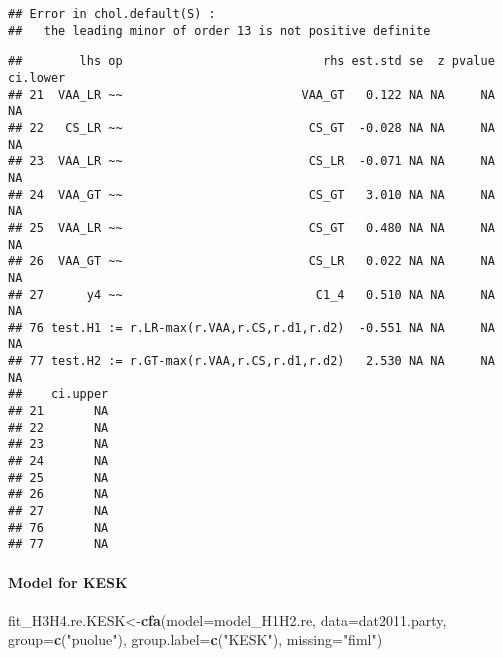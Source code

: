 \documentclass[
]{article}
\newenvironment{Shaded}{\begin{snugshade}}{\end{snugshade}}
\newcommand{\DataTypeTok}[1]{\textcolor[rgb]{0.13,0.29,0.53}{#1}}
\newcommand{\KeywordTok}[1]{\textcolor[rgb]{0.13,0.29,0.53}{\textbf{#1}}}
\newcommand{\NormalTok}[1]{#1}
\newcommand{\OperatorTok}[1]{\textcolor[rgb]{0.81,0.36,0.00}{\textbf{#1}}}
\newcommand{\StringTok}[1]{\textcolor[rgb]{0.31,0.60,0.02}{#1}}
\begin{document}
\begin{verbatim}
## Error in chol.default(S) : 
##   the leading minor of order 13 is not positive definite
\end{verbatim}

\begin{Shaded}
\end{Shaded}

\begin{verbatim}
##        lhs op                            rhs est.std se  z pvalue ci.lower
## 21  VAA_LR ~~                         VAA_GT   0.122 NA NA     NA       NA
## 22   CS_LR ~~                          CS_GT  -0.028 NA NA     NA       NA
## 23  VAA_LR ~~                          CS_LR  -0.071 NA NA     NA       NA
## 24  VAA_GT ~~                          CS_GT   3.010 NA NA     NA       NA
## 25  VAA_LR ~~                          CS_GT   0.480 NA NA     NA       NA
## 26  VAA_GT ~~                          CS_LR   0.022 NA NA     NA       NA
## 27      y4 ~~                           C1_4   0.510 NA NA     NA       NA
## 76 test.H1 := r.LR-max(r.VAA,r.CS,r.d1,r.d2)  -0.551 NA NA     NA       NA
## 77 test.H2 := r.GT-max(r.VAA,r.CS,r.d1,r.d2)   2.530 NA NA     NA       NA
##    ci.upper
## 21       NA
## 22       NA
## 23       NA
## 24       NA
## 25       NA
## 26       NA
## 27       NA
## 76       NA
## 77       NA
\end{verbatim}

\newpage

\hypertarget{model-for-kesk}{%
\paragraph{Model for KESK}\label{model-for-kesk}}

\begin{Shaded}
\begin{Highlighting}[]
\NormalTok{fit_H3H4.re.KESK<-}\KeywordTok{cfa}\NormalTok{(}\DataTypeTok{model=}\NormalTok{model_H1H2.re,}
                    \DataTypeTok{data=}\NormalTok{dat2011.party,}
                    \DataTypeTok{group=}\KeywordTok{c}\NormalTok{(}\StringTok{"puolue"}\NormalTok{),}
                    \DataTypeTok{group.label=}\KeywordTok{c}\NormalTok{(}\StringTok{"KESK"}\NormalTok{),}
                    \DataTypeTok{missing=}\StringTok{"fiml"}\NormalTok{)}
\end{Highlighting}
\end{Shaded}
\end{document}
